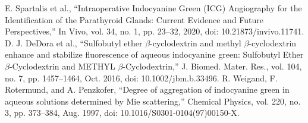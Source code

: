 \begin{thebibliography}{99}
 E. Spartalis et al., “Intraoperative Indocyanine Green (ICG) Angiography for the Identification of the Parathyroid Glands: Current Evidence and Future Perspectives,” In Vivo, vol. 34, no. 1, pp. 23–32, 2020, doi: 10.21873/invivo.11741.
D. J. DeDora et al., “Sulfobutyl ether $\beta$-cyclodextrin and methyl $\beta$-cyclodextrin enhance and stabilize fluorescence of aqueous indocyanine green: Sulfobutyl Ether $\beta$-Cyclodextrin and METHYL $\beta$-Cyclodextrin,” J. Biomed. Mater. Res., vol. 104, no. 7, pp. 1457–1464, Oct. 2016, doi: 10.1002/jbm.b.33496.
R. Weigand, F. Rotermund, and A. Penzkofer, “Degree of aggregation of indocyanine green in aqueous solutions determined by Mie scattering,” Chemical Physics, vol. 220, no. 3, pp. 373–384, Aug. 1997, doi: 10.1016/S0301-0104(97)00150-X.
\end{thebibliography}
